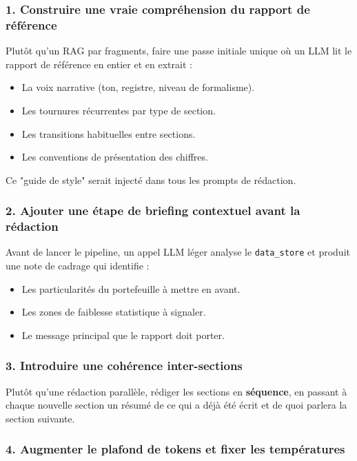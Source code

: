 \documentclass[12pt,a4paper]{article}
\begin{document}
\begin{diagbox}

\subsubsection*{1. Construire une vraie compréhension du rapport de référence}

Plutôt qu'un RAG par fragments, faire une passe initiale unique où un LLM
lit le rapport de référence en entier et en extrait :
\begin{itemize}[leftmargin=1.5em, itemsep=0pt]
  \item La voix narrative (ton, registre, niveau de formalisme).
  \item Les tournures récurrentes par type de section.
  \item Les transitions habituelles entre sections.
  \item Les conventions de présentation des chiffres.
\end{itemize}
Ce "guide de style" serait injecté dans tous les prompts de rédaction.

\subsubsection*{2. Ajouter une étape de briefing contextuel avant la rédaction}

Avant de lancer le pipeline, un appel LLM léger analyse le \texttt{data\_store}
et produit une note de cadrage qui identifie :
\begin{itemize}[leftmargin=1.5em, itemsep=0pt]
  \item Les particularités du portefeuille à mettre en avant.
  \item Les zones de faiblesse statistique à signaler.
  \item Le message principal que le rapport doit porter.
\end{itemize}

\subsubsection*{3. Introduire une cohérence inter-sections}

Plutôt qu'une rédaction parallèle, rédiger les sections en \textbf{séquence}, en
passant à chaque nouvelle section un résumé de ce qui a déjà été écrit et de
quoi parlera la section suivante.

\subsubsection*{4. Augmenter le plafond de tokens et fixer les températures}


\end{diagbox}
\end{document}
